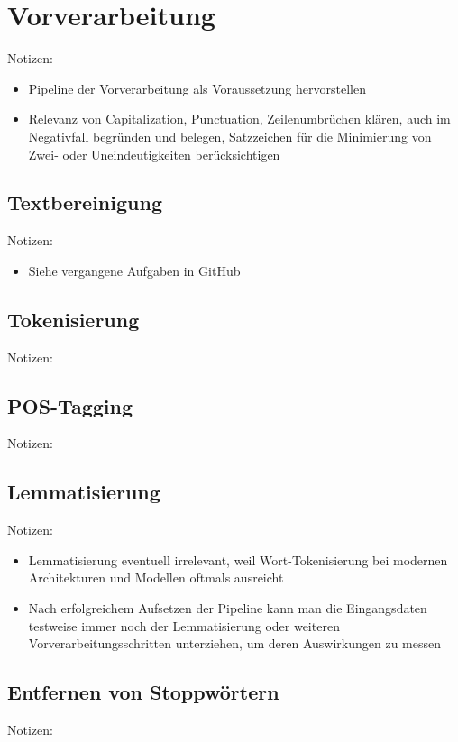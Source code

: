 \section{Vorverarbeitung}
Notizen:
\begin{itemize}
	\item Pipeline der Vorverarbeitung als Voraussetzung hervorstellen
	\item Relevanz von Capitalization, Punctuation, Zeilenumbrüchen klären, auch im Negativfall begründen und belegen, Satzzeichen für die Minimierung von Zwei- oder Uneindeutigkeiten berücksichtigen
\end{itemize}


\subsection{Textbereinigung}
Notizen:
\begin{itemize}
	\item Siehe vergangene Aufgaben in GitHub
\end{itemize}


\subsection{Tokenisierung}
Notizen:


\subsection{POS-Tagging}
Notizen:


\subsection{Lemmatisierung}
Notizen:
\begin{itemize}
	\item Lemmatisierung eventuell irrelevant, weil Wort-Tokenisierung bei modernen Architekturen und Modellen oftmals ausreicht
	\item Nach erfolgreichem Aufsetzen der Pipeline kann man die Eingangsdaten testweise immer noch der Lemmatisierung oder weiteren Vorverarbeitungsschritten unterziehen, um deren Auswirkungen zu messen
\end{itemize}


\subsection{Entfernen von Stoppwörtern}
Notizen:

